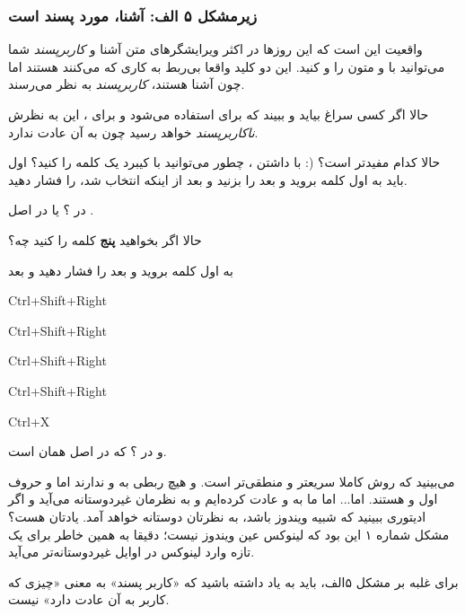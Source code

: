 \subsubsection*{زیرمشکل ۵ الف: آشنا، مورد پسند است}
واقعیت این است که این روزها در اکثر ویرایشگرهای متن آشنا و
\emph{کاربرپسند}
شما می‌توانید با 
 و 
 متون را 
 و 
 کنید. این‌ دو کلید واقعا بی‌ربط به کاری که می‌کنند هستند اما چون آشنا هستند،
\emph{کاربرپسند}
به نظر می‌رسند.

حالا اگر کسی سراغ 
بیاید و ببیند که 
برای 
 استفاده می‌شود و 
برای 
، این به نظرش
\emph{ناکاربرپسند}
خواهد رسید چون به آن عادت ندارد.

حالا کدام مفیدتر است؟ 
(:
با داشتن 
، چطور می‌توانید با کیبرد یک کلمه را 
 کنید؟ اول باید به اول کلمه بروید و بعد 
 را بزنید و بعد از اینکه انتخاب شد، 
 را فشار دهید.

در 
؟ 
یا در اصل 
.


حالا اگر بخواهید
\textbf{پنج}
کلمه را 
 کنید چه؟
 
 به اول کلمه بروید و بعد 
 را فشار دهید و بعد

\begin{frameng}
Ctrl+Shift+Right

Ctrl+Shift+Right

Ctrl+Shift+Right

Ctrl+Shift+Right

Ctrl+X
\end{frameng}

و در 
؟ 
 که در اصل همان 
 است.

می‌بینید که روش 
کاملا سریعتر و منطقی‌تر است. 
و 
هیچ ربطی به 
 و 
ندارند اما 
و 
حروف اول 
 و 
 هستند. اما... اما ما به 
و 
عادت کرده‌ایم و 
به نظرمان غیردوستانه می‌آید و اگر ادیتوری ببینید که شبیه ویندوز باشد، به نظرتان دوستانه خواهد‌ آمد. یادتان هست؟‌ مشکل شماره ۱ این بود که لینوکس عین ویندوز نیست؛ دقیقا به همین خاطر برای یک تازه وارد لینوکس در اوایل غیردوستانه‌تر می‌آید.

برای غلبه بر مشکل ۵الف، باید به یاد داشته باشید که «کاربر پسند» به معنی «چیزی که کاربر به آن عادت دارد» نیست.
